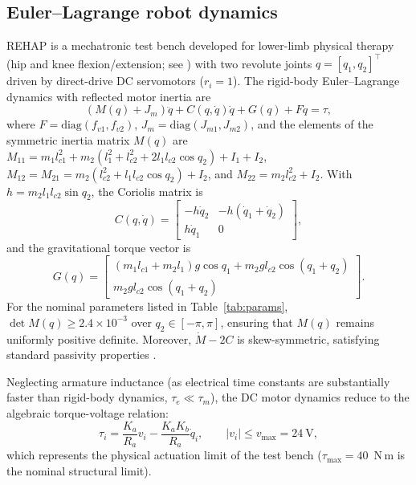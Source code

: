 \documentclass[a4paper,fleqn]{cas-dc}
\newcommand{\rehap}{REHAP}
\begin{document}
\subsection{Euler--Lagrange robot dynamics}
\rehap{} is a mechatronic test bench developed for lower-limb physical therapy (hip and knee flexion/extension; see \cite{cervantes2025tesis,cervantes2025congreso}) with two revolute joints $q=[q_1,q_2]^\top$ driven by direct-drive DC servomotors ($r_i=1$). The rigid-body Euler--Lagrange dynamics with reflected motor inertia are
\begin{equation}
(M(q)+J_m)\ddot q + C(q,\dot q)\dot q + G(q) + F\dot q = \tau,
\label{eq:dyn}
\end{equation}
where $F=\mathrm{diag}(f_{v1},f_{v2})$, $J_m=\mathrm{diag}(J_{m1},J_{m2})$, and the elements of the symmetric inertia matrix $M(q)$ are $M_{11}=m_1l_{c1}^2+m_2(l_1^2+l_{c2}^2+2l_1l_{c2}\cos q_2)+I_1+I_2$, $M_{12}=M_{21}=m_2(l_{c2}^2+l_1l_{c2}\cos q_2)+I_2$, and $M_{22}=m_2l_{c2}^2+I_2$. With $h=m_2l_1l_{c2}\sin q_2$, the Coriolis matrix is
\begin{equation}
C(q,\dot q)=\begin{bmatrix}-h\dot q_2 & -h(\dot q_1+\dot q_2)\\ h\dot q_1 & 0\end{bmatrix},
\label{eq:coriolis}
\end{equation}
and the gravitational torque vector is
\begin{equation}
G(q)=\begin{bmatrix}(m_1l_{c1}+m_2l_1)g\cos q_1+m_2gl_{c2}\cos(q_1+q_2)\\ m_2gl_{c2}\cos(q_1+q_2)\end{bmatrix}.
\label{eq:gravity}
\end{equation}
For the nominal parameters listed in Table~\ref{tab:params}, $\det M(q)\ge2.4\times10^{-3}$ over $q_2\in[-\pi,\pi]$, ensuring that $M(q)$ remains uniformly positive definite. Moreover, $\dot M-2C$ is skew-symmetric, satisfying standard passivity properties \cite{spong2006}.

Neglecting armature inductance (as electrical time constants are substantially faster than rigid-body dynamics, $\tau_e \ll \tau_m$), the DC motor dynamics reduce to the algebraic torque-voltage relation:
\begin{equation}
\tau_i=\frac{K_a}{R_a}v_i-\frac{K_aK_b}{R_a}\dot q_i,\qquad |v_i|\le v_{\max}=24~\mathrm{V},
\label{eq:motor}
\end{equation}
which represents the physical actuation limit of the test bench ($\tau_{\max}=40$~N\,m is the nominal structural limit).
\end{document}

